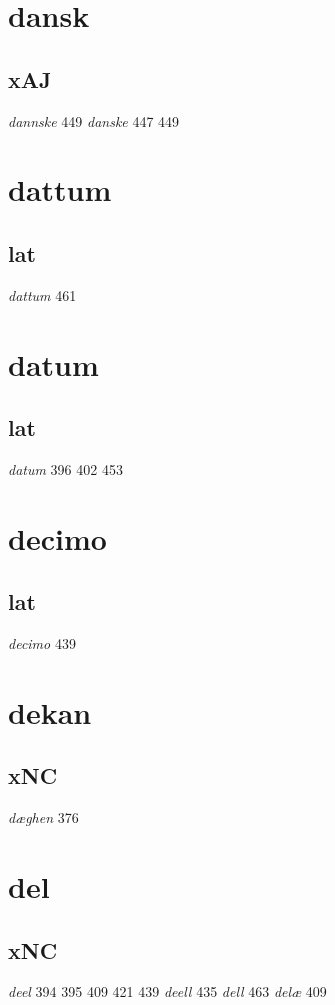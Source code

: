 \documentclass[a4paper,twocolumn]{article}
\begin{document}
\section{dansk}
\label{sec:org7942976}
\subsection{xAJ}
\label{sec:org298bd67}
\emph{dannske} 449 \emph{danske} 447 449 
\section{dattum}
\label{sec:org3a36332}
\subsection{lat}
\label{sec:org7bc6ea9}
\emph{dattum} 461 
\section{datum}
\label{sec:org30d451e}
\subsection{lat}
\label{sec:org884fb3d}
\emph{datum} 396 402 453 
\section{decimo}
\label{sec:org3e269b4}
\subsection{lat}
\label{sec:org71667de}
\emph{decimo} 439 
\section{dekan}
\label{sec:org5e27ff5}
\subsection{xNC}
\label{sec:orga5ab81b}
\emph{dæghen} 376 
\section{del}
\label{sec:org464c3c4}
\subsection{xNC}
\label{sec:orgc7bc577}
\emph{deel} 394 395 409 421 439 \emph{deell} 435 \emph{dell} 463 \emph{delæ} 409 
\end{document}
